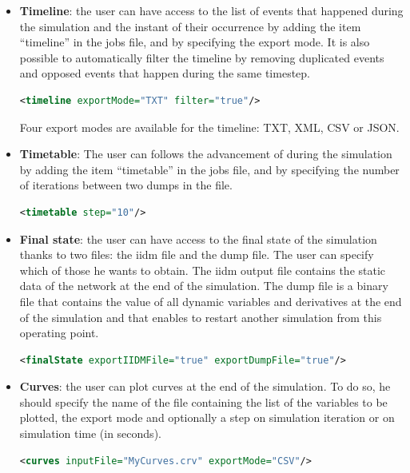 \documentclass[a4paper, 12pt]{report}
\begin{document}
\begin{itemize}
\item \textbf{Timeline}: the user can have access to the list of events that happened during the simulation and the instant of their occurrence by adding the item ``timeline'' in the jobs file, and by specifying the export mode. It is also possible to automatically filter the timeline by removing duplicated events and opposed events that happen during the same timestep.

\begin{lstlisting}[language=XML, morekeywords={timeline},numbers=none]
<timeline exportMode="TXT" filter="true"/>
\end{lstlisting}
Four export modes are available for the timeline: TXT, XML, CSV or JSON.

\item \textbf{Timetable}: The user can follows the advancement of \Dynawo during the simulation by adding the item ``timetable'' in the jobs file, and by specifying the number of iterations between two dumps in the file.

\begin{lstlisting}[language=XML, morekeywords={timeline},numbers=none]
<timetable step="10"/>
\end{lstlisting}

\item \textbf{Final state}: the user can have access to the final state of the simulation thanks to two files: the iidm file and the dump file. The user can specify which of those he wants to obtain. The iidm output file contains the static data of the network at the end of the simulation. The dump file is a binary file that contains the value of all dynamic variables and derivatives at the end of the simulation and that enables to restart another simulation from this operating point.

\begin{lstlisting}[language=XML, morekeywords={finalState},numbers=none]
<finalState exportIIDMFile="true" exportDumpFile="true"/>
\end{lstlisting}

\item \textbf{Curves}: the user can plot curves at the end of the simulation. To do so, he should specify the name of the file containing the list of the variables to be plotted, the export mode and optionally a step on simulation iteration or on simulation time (in seconds).

\begin{lstlisting}[language=XML, morekeywords={curves},numbers=none]
<curves inputFile="MyCurves.crv" exportMode="CSV"/>
\end{lstlisting}


\end{itemize}
\end{document}
